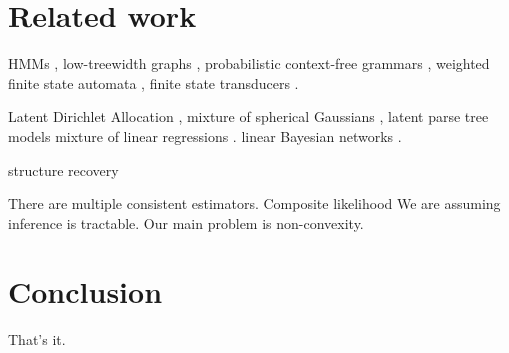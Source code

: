 \section{Related work}

HMMs \cite{hsu09spectral},
low-treewidth graphs \cite{parikh12spectral},
probabilistic context-free grammars \cite{cohen12pcfg},
weighted finite state automata \cite{balle12automata},
finite state transducers \cite{balle11transducer}.

Latent Dirichlet Allocation \cite{anandkumar12lda},
mixture of spherical Gaussians \cite{hsu13spherical},
latent parse tree models \cite{hsu12identifiability}
mixture of linear regressions \cite{chaganty13regression}.
linear Bayesian networks \cite{anandkumar12linear}.

structure recovery
\cite{anandkumar11tree}

There are multiple consistent estimators.
Composite likelihood \cite{besag75pseudo,lindsay88composite,liang08asymptotics}
We are assuming inference is tractable.
Our main problem is non-convexity.

\section{Conclusion}

That's it.
